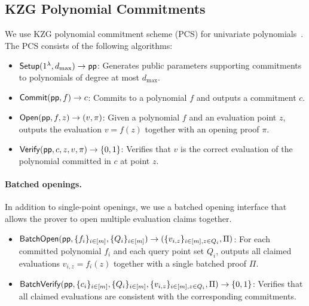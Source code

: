 



\subsection{KZG Polynomial Commitments}\label{subsec:prelim-kzg}

We use KZG polynomial commitment scheme (PCS) for univariate polynomials~\cite{kzg10}.
The PCS consists of the following algorithms:

\begin{itemize}
    \item $\mathsf{Setup}(1^\lambda, d_{\max}) \rightarrow \mathsf{pp}$:
    Generates public parameters supporting commitments to polynomials of degree at most $d_{\max}$.

    \item $\mathsf{Commit}(\mathsf{pp}, f) \rightarrow c$:
    Commits to a polynomial $f$ and outputs a commitment $c$.

    \item $\mathsf{Open}(\mathsf{pp}, f, z) \rightarrow (v, \pi)$:
    Given a polynomial $f$ and an evaluation point $z$, outputs the evaluation
    $v = f(z)$ together with an opening proof $\pi$.

    \item $\mathsf{Verify}(\mathsf{pp}, c, z, v, \pi) \rightarrow \{0,1\}$:
    Verifies that $v$ is the correct evaluation of the polynomial committed in $c$
    at point $z$.
\end{itemize}

\paragraph{Batched openings.}
In addition to single-point openings, we use a batched opening interface that
allows the prover to open multiple evaluation claims together.

\begin{itemize}
    \item $\mathsf{BatchOpen}(\mathsf{pp}, \{f_i\}_{i \in [m]}, \{Q_i\}_{i \in [m]})
    \rightarrow (\{v_{i,z}\}_{i \in [m], z \in Q_i}, \Pi)$:
    For each committed polynomial $f_i$ and each query point set $Q_i$,
    outputs all claimed evaluations $v_{i,z} = f_i(z)$ together with a single
    batched proof $\Pi$.

    \item $\mathsf{BatchVerify}(\mathsf{pp}, \{c_i\}_{i \in [m]}, \{Q_i\}_{i \in [m]},
    \{v_{i,z}\}_{i \in [m], z \in Q_i}, \Pi) \rightarrow \{0,1\}$:
    Verifies that all claimed evaluations are consistent with the corresponding
    commitments.
\end{itemize}

